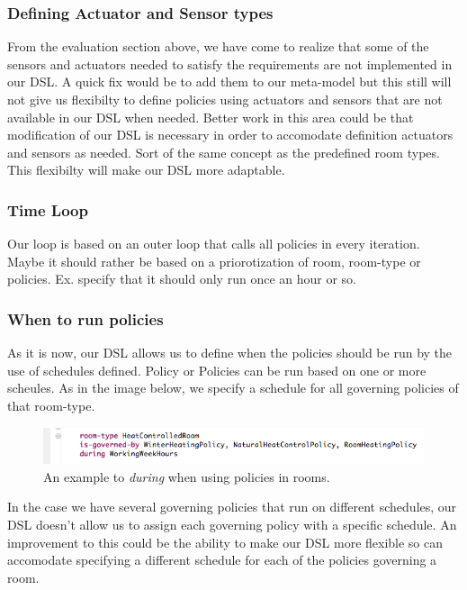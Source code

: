 \documentclass{llncs}
\begin{document}
\subsubsection{Defining Actuator and Sensor types}\label{subsec:def-sensor-actuator-types}
From the evaluation section above, we have come to realize that some of the sensors and actuators needed to satisfy the requirements are not implemented in our DSL. A quick fix would be to add them to our meta-model but this still will not give us flexibilty to define policies using actuators and sensors that are not available in our DSL when needed. Better work in this area could be that modification of our DSL is necessary in order to accomodate definition actuators and sensors as needed. Sort of the same concept as the predefined room types. This flexibilty will make our DSL more adaptable.


\subsubsection{Time Loop}\label{subsec:looptime}
Our loop is based on an outer loop that calls all policies in every iteration. Maybe it should rather be based on a priorotization of room, room-type or policies. Ex. specify that it should only run once an hour or so.

\subsubsection{When to run policies}\label{subsec:during}
As it is now, our DSL allows us to define when the policies should be run by the use of schedules defined. Policy or Policies can be run based on one or more scheules. As in the image below, we specify a schedule for all governing policies of that room-type. 
\begin{figure}
  \centering
    \includegraphics[scale=0.5]{dsl-during.png} 
	\caption{An example to \textit{during} when using policies in rooms.}
	\label{fig:during}
\end{figure}
In the case we have several governing policies that run on different schedules, our DSL doesn't allow us to assign each governing policy with a specific schedule. An improvement to this could be the ability to make our DSL more flexible so can accomodate specifying a different schedule for each of the policies governing a room. 
\end{document}

